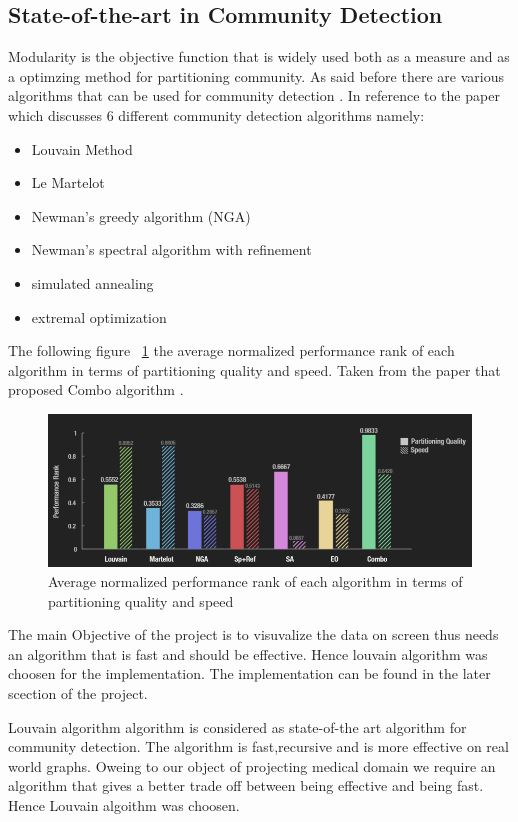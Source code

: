 \subsection{State-of-the-art in Community Detection}
Modularity is the objective function that is widely used both as a measure and as a optimzing method for partitioning community.
As said before there are various algorithms that can be used for community detection . In reference to the paper \cite{generalcommunity} which discusses 6 different community detection algorithms namely: 
\begin{itemize}
\item Louvain Method
\item Le Martelot
\item Newman’s greedy algorithm (NGA)
\item Newman’s spectral algorithm with refinement
\item simulated annealing
\item extremal optimization
\end{itemize}
The following figure ~\ref{Fig1} the average normalized performance rank of each algorithm in terms of partitioning quality and speed. Taken from the paper that proposed Combo algorithm \cite{generalcommunity}. 
\begin{figure}[h]
\includegraphics[scale=0.5]{lou.png}
\centering
\caption{\label{Fig1}Average normalized performance rank of each algorithm in terms of partitioning quality and speed}

\end{figure}
The main Objective of the project is to visuvalize the data on screen thus needs an algorithm that is fast and should be effective.  Hence louvain algorithm was choosen for the implementation. The implementation can be found in the later scection of the project.


Louvain algorithm algorithm is considered as state-of-the art algorithm for community detection\cite{louvain}. The algorithm is fast,recursive and is more effective on real world graphs. Oweing to our object of projecting medical domain we require an algorithm that gives a better trade off between being effective and being fast. Hence Louvain algoithm was choosen.


